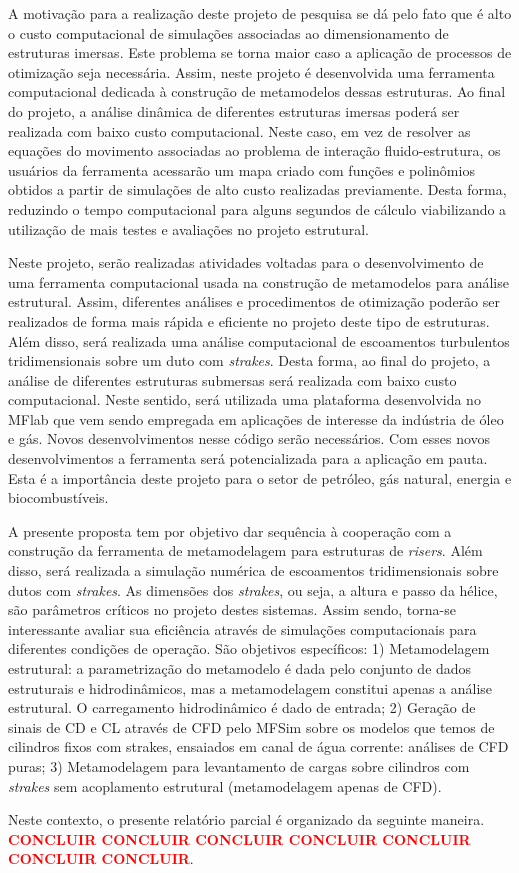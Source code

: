 A motivação para a realização deste projeto de pesquisa se dá pelo fato que é alto o custo computacional de simulações associadas ao dimensionamento de estruturas imersas. Este problema se torna maior caso a aplicação de processos de otimização seja necessária. Assim, neste projeto é desenvolvida uma ferramenta computacional dedicada à construção de metamodelos dessas estruturas. Ao final do projeto, a análise dinâmica de diferentes estruturas imersas poderá ser realizada com baixo custo computacional. Neste caso, em vez de resolver as equações do movimento associadas ao problema de interação fluido-estrutura, os usuários da ferramenta acessarão um mapa criado com funções e polinômios obtidos a partir de simulações de alto custo realizadas previamente. Desta forma, reduzindo o tempo computacional para alguns segundos de cálculo viabilizando a utilização de mais testes e avaliações no projeto estrutural. 

Neste projeto, serão realizadas atividades voltadas para o desenvolvimento de uma ferramenta computacional usada na construção de metamodelos para análise estrutural. Assim, diferentes análises e procedimentos de otimização poderão ser realizados de forma mais rápida e eficiente no projeto deste tipo de estruturas. Além disso, será realizada uma análise computacional de escoamentos turbulentos tridimensionais sobre um duto com \textit{strakes}. Desta forma, ao final do projeto, a análise de diferentes estruturas submersas será realizada com baixo custo computacional. Neste sentido, será utilizada uma plataforma desenvolvida no MFlab que vem sendo empregada em aplicações de interesse da indústria de óleo e gás. Novos desenvolvimentos nesse código serão necessários. Com esses novos desenvolvimentos a ferramenta será potencializada para a aplicação em pauta. Esta é a importância deste projeto para o setor de petróleo, gás natural, energia e biocombustíveis.

A presente proposta tem por objetivo dar sequência à cooperação com a construção da ferramenta de metamodelagem para estruturas de \textit{risers}. Além disso, será realizada a simulação numérica de escoamentos tridimensionais sobre dutos com \textit{strakes}. As dimensões dos \textit{strakes}, ou seja, a altura e passo da hélice, são parâmetros críticos no projeto destes sistemas. Assim sendo, torna-se interessante avaliar sua eficiência através de simulações computacionais para diferentes condições de operação. São objetivos específicos: 1) Metamodelagem estrutural: a parametrização do metamodelo é dada pelo conjunto de dados estruturais e hidrodinâmicos, mas a metamodelagem constitui apenas a análise estrutural. O carregamento hidrodinâmico é dado de entrada; 2) Geração de sinais de CD e CL através de CFD pelo MFSim sobre os modelos que temos de cilindros fixos com strakes, ensaiados em canal de água corrente: análises de CFD puras; 3) Metamodelagem para levantamento de cargas sobre cilindros com \textit{strakes} sem acoplamento estrutural (metamodelagem apenas de CFD).

Neste contexto, o presente relatório parcial é organizado da seguinte maneira. \textcolor{red}{\textbf{CONCLUIR CONCLUIR CONCLUIR CONCLUIR CONCLUIR CONCLUIR CONCLUIR}}.